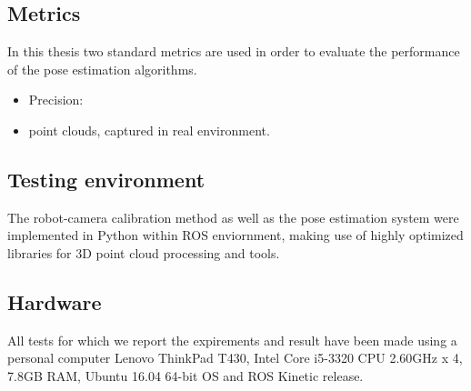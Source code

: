 \subsection{Metrics}
In this thesis two standard metrics are used in order to evaluate the performance of the pose estimation algorithms.
\begin{itemize}
\item Precision:
\item point clouds, captured in real environment. 
\end{itemize}

\subsection{Testing environment}
The robot-camera calibration method as well as the pose estimation system were implemented in Python within ROS enviornment, making use of highly optimized libraries for 3D point cloud processing and tools. 

\subsection{Hardware}
All tests for which we report the expirements and result have been made using a personal computer Lenovo ThinkPad T430, Intel Core i5-3320 CPU 2.60GHz x 4, 7.8GB RAM, Ubuntu 16.04 64-bit OS
and ROS Kinetic release.

\fi